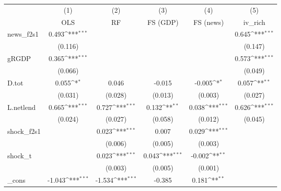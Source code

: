 {
\def\sym#1{\ifmmode^{#1}\else\(^{#1}\)\fi}
\begin{tabular}{l*{5}{c}}
\toprule
            &\multicolumn{1}{c}{(1)}&\multicolumn{1}{c}{(2)}&\multicolumn{1}{c}{(3)}&\multicolumn{1}{c}{(4)}&\multicolumn{1}{c}{(5)}\\
            &\multicolumn{1}{c}{OLS}&\multicolumn{1}{c}{RF}&\multicolumn{1}{c}{FS (GDP)}&\multicolumn{1}{c}{FS (news)}&\multicolumn{1}{c}{iv\_rich}\\
\midrule
news\_f2s1   &       0.493\sym{***}&                     &                     &                     &       0.645\sym{***}\\
            &     (0.116)         &                     &                     &                     &     (0.147)         \\
\addlinespace
gRGDP       &       0.365\sym{***}&                     &                     &                     &       0.573\sym{***}\\
            &     (0.066)         &                     &                     &                     &     (0.049)         \\
\addlinespace
D.tot       &       0.055\sym{*}  &       0.046         &      -0.015         &      -0.005\sym{*}  &       0.057\sym{**} \\
            &     (0.031)         &     (0.028)         &     (0.013)         &     (0.003)         &     (0.027)         \\
\addlinespace
L.netlend   &       0.665\sym{***}&       0.727\sym{***}&       0.132\sym{**} &       0.038\sym{***}&       0.626\sym{***}\\
            &     (0.024)         &     (0.027)         &     (0.058)         &     (0.012)         &     (0.045)         \\
\addlinespace
shock\_f2s1  &                     &       0.023\sym{***}&       0.007         &       0.029\sym{***}&                     \\
            &                     &     (0.006)         &     (0.005)         &     (0.003)         &                     \\
\addlinespace
shock\_t     &                     &       0.023\sym{***}&       0.043\sym{***}&      -0.002\sym{**} &                     \\
            &                     &     (0.003)         &     (0.005)         &     (0.001)         &                     \\
\addlinespace
\_cons      &      -1.043\sym{***}&      -1.534\sym{***}&      -0.385         &       0.181\sym{**} &                     \\

\end{tabular}}
